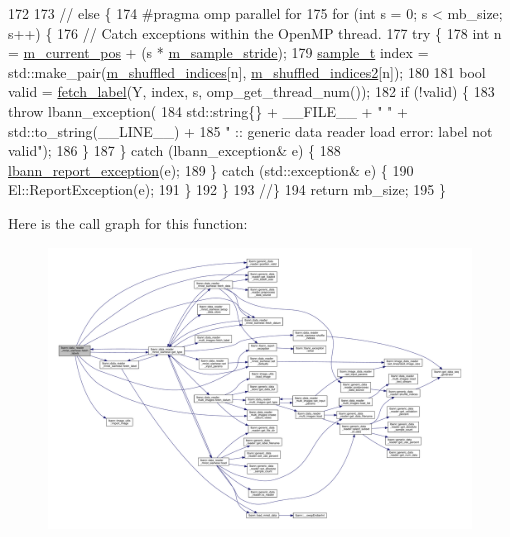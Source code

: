 \begin{DoxyCode}
172 
173 \textcolor{comment}{//  else \{}
174 \textcolor{preprocessor}{    #pragma omp parallel for}
175     \textcolor{keywordflow}{for} (\textcolor{keywordtype}{int} s = 0; s < mb\_size; s++) \{
176       \textcolor{comment}{// Catch exceptions within the OpenMP thread.}
177       \textcolor{keywordflow}{try} \{
178         \textcolor{keywordtype}{int} n = \hyperlink{classlbann_1_1generic__data__reader_a2facf4e410099ac8c1fa586e797ec2e0}{m\_current\_pos} + (s * \hyperlink{classlbann_1_1generic__data__reader_a58461c39de7e17eafc5b98aec99cbb9b}{m\_sample\_stride});
179         \hyperlink{classlbann_1_1data__reader__mnist__siamese_af159922f68098bfcb16a9df46d501103}{sample\_t} index = std::make\_pair(\hyperlink{classlbann_1_1generic__data__reader_aaab6aeff67ffff1c689336851fec2c57}{m\_shuffled\_indices}[n], 
      \hyperlink{classlbann_1_1data__reader__mnist__siamese_a42a4b1513a7305cc62d219ac0d9473c3}{m\_shuffled\_indices2}[n]);
180 
181         \textcolor{keywordtype}{bool} valid = \hyperlink{classlbann_1_1data__reader__mnist__siamese_a0f4171af4c56100c1c78cb53e938222c}{fetch\_label}(Y, index, s, omp\_get\_thread\_num());
182         \textcolor{keywordflow}{if} (!valid) \{
183           \textcolor{keywordflow}{throw} lbann\_exception(
184             std::string\{\} + \_\_FILE\_\_ + \textcolor{stringliteral}{" "} + std::to\_string(\_\_LINE\_\_) +
185             \textcolor{stringliteral}{" :: generic data reader load error: label not valid"});
186         \}
187       \} \textcolor{keywordflow}{catch} (lbann\_exception& e) \{
188         \hyperlink{namespacelbann_aedccb3bf2d674ccb5573ab9960720731}{lbann\_report\_exception}(e);
189       \} \textcolor{keywordflow}{catch} (std::exception& e) \{
190         El::ReportException(e);
191       \}
192     \}
193   \textcolor{comment}{//\}}
194   \textcolor{keywordflow}{return} mb\_size;
195 \}
\end{DoxyCode}
Here is the call graph for this function\+:\nopagebreak
\begin{figure}[H]
\begin{center}
\leavevmode
\includegraphics[width=350pt]{classlbann_1_1data__reader__mnist__siamese_a1709140fcdcea9baaaf1bab7a48f3bce_cgraph}
\end{center}
\end{figure}
